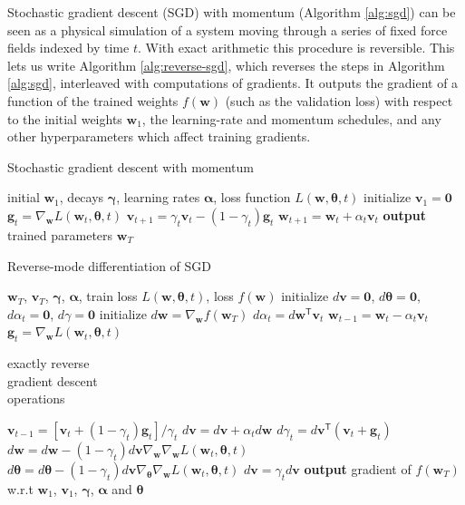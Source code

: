 \documentclass{article}
\newcommand{\vw}{\mathbf{w}}
\newcommand{\vv}{\mathbf{v}}
\newcommand{\vg}{\mathbf{g}}
\newcommand{\vzero}{\mathbf{0}}
\newcommand{\tra}{^{\mathsf{T}}}
\newcommand{\hypers}{{\boldsymbol{\theta}}}
\newcommand{\params}{\vw}
\newcommand{\decay}{\gamma}
\newcommand{\decays}{{\boldsymbol{\decay}}}
\newcommand{\stepsize}{\alpha}
\newcommand{\stepsizes}{{\boldsymbol{\stepsize}}}
\newcommand{\gradparams}{\nabla_\params L(\params_t, \hypers, t)}
\begin{document}
Stochastic gradient descent (SGD) with momentum (Algorithm \ref{alg:sgd}) can be
seen as a physical simulation of a system moving through a series of fixed force
fields indexed by time $t$. With exact arithmetic this procedure is reversible. This lets us write Algorithm \ref{alg:reverse-sgd}, which reverses the steps in Algorithm
\ref{alg:sgd}, interleaved with computations of gradients. It outputs the
gradient of a function of the trained weights $f(\params)$ (such as the validation
loss) with respect to the initial weights $\params_1$, the learning-rate and momentum
schedules, and any other hyperparameters which affect training gradients.

\begin{algorithm}
   \caption{Stochastic gradient descent with momentum}
   \label{alg:sgd}
\begin{algorithmic}[1]
    initial $\params_1$, decays $\decays$, learning rates $\stepsizes$, loss function $L(\params, \hypers, t)$
   \State initialize $\vv_1 = \vzero$
   \State $\vg_t = \gradparams$ 
   \State $\vv_{t+1} = \decay_t \vv_t - (1 - \decay_t) \vg_t$   \label{step:update velocity}
   \State $\params_{t+1} = \params_t + \stepsize_t \vv_t$  \label{step:update position}
   \EndFor
   \State \textbf{output} trained parameters $\params_T$
\end{algorithmic}
\end{algorithm}
%
\begin{algorithm}
   \caption{Reverse-mode differentiation of SGD}
   \label{alg:reverse-sgd}
\begin{algorithmic}[1]
    $\params_T$, $\vv_T$, $\decays$, $\stepsizes$, train loss $L(\params, \hypers, t)$, loss $f(\params)$
   \State initialize $d\vv = \vzero$, $d\hypers = \vzero$, $d\stepsize_t = \vzero$, $d\decay = \vzero$
   \State initialize $d\params = \nabla_\params f(\params_T)$
   \State $d\stepsize_t = d\params\tra \vv_t$
   \State $\params_{t-1} = \params_t - \stepsize_t \vv_t$ \label{step:reverse-position}
   \vspace{-0.95\baselineskip}
   \State $\vg_t = \gradparams$ \label{step:reverse-gradient}
   \hfill \scalebox{1.1}{\Bigg\}} \vspace{-\baselineskip} \begin{minipage}{2.5cm} exactly reverse \\ gradient descent \\ operations \strut \end{minipage}
   \State $\vv_{t-1} = [\vv_t + (1 - \decay_t) \vg_t] / \decay_t$ \label{step:reverse-velocity}
   \State $d\vv = d\vv + \stepsize_t d\params$
   \State $d\decay_t = d\vv\tra (\vv_t + \vg_t)$
   \State $d\params = d\params - (1 - \decay_t) d\vv \nabla_\params \gradparams$ \label{line:hvp1}
   \State $d\hypers = d\hypers - (1 - \decay_t) d\vv \nabla_\hypers \gradparams$ \label{line:hvp2}
   \State $d\vv = \decay_t d\vv$
   \EndFor
   \State \textbf{output} gradient of $f(\params_T)$ w.r.t $\params_1$, $\vv_1$, $\decays$, $\stepsizes$ and $\hypers$
\end{algorithmic}
\end{algorithm}
\end{document}
